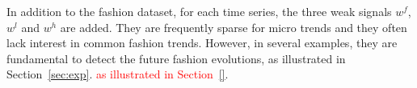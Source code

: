 \documentclass{article} %
\newcommand{\ts}{y}
\newcommand{\fullts}{{\bf \ts}}
\newcommand{\lag}{h}
\newcommand{\ws}{w}
\begin{document}
%


In addition to the fashion dataset, for each time series, the three weak signals $\ws^{f}$,$\ws^{l}$ and $\ws^{h}$ are added. They are frequently sparse for micro trends and they often lack interest in common fashion trends. However, in several examples, they are fundamental to detect the future fashion evolutions, as illustrated in Section~\ref{sec:exp}. \textcolor{red}{as illustrated in Section~\ref{}}.









\end{document}
